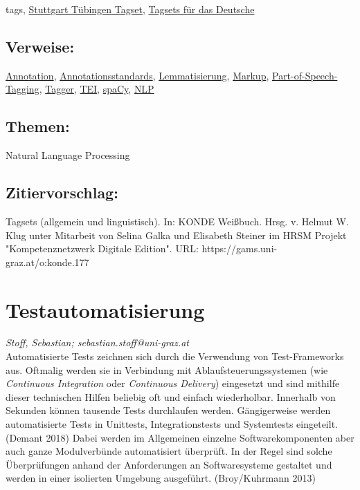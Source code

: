 \documentclass{article}
\begin{document}
{                           tags}, \href{https://homepage.ruhr-uni-bochum.de/Stephen.Berman/Korpuslinguistik/Tagsets-STTS.html}{Stuttgart Tübingen Tagset}, \href{https://www.ims.uni-stuttgart.de/forschung/ressourcen/lexika/germantagsets/}{Tagsets für das Deutsche}\subsection*{Verweise:}\href{https://gams.uni-graz.at/o:konde.17}{Annotation}, \href{https://gams.uni-graz.at/o:konde.29}{Annotationsstandards}, \href{https://gams.uni-graz.at/o:konde.115}{Lemmatisierung}, \href{https://gams.uni-graz.at/o:konde.126}{Markup}, \href{https://gams.uni-graz.at/o:konde.156}{Part-of-Speech-Tagging}, \href{https://gams.uni-graz.at/o:konde.176}{Tagger}, \href{https://gams.uni-graz.at/o:konde.178}{TEI}, \href{https://gams.uni-graz.at/o:konde.170}{spaCy}, \href{https://gams.uni-graz.at/o:konde.145}{NLP}\subsection*{Themen:}Natural Language Processing\subsection*{Zitiervorschlag:}Tagsets (allgemein und linguistisch). In: KONDE Weißbuch. Hrsg. v. Helmut W. Klug unter Mitarbeit von Selina Galka und Elisabeth Steiner im HRSM Projekt "Kompetenznetzwerk Digitale Edition". URL: https://gams.uni-graz.at/o:konde.177\newpage\section*{Testautomatisierung} \emph{Stoff, Sebastian; sebastian.stoff@uni-graz.at }\\
        
    Automatisierte Tests zeichnen sich durch die Verwendung von Test-Frameworks aus. Oftmalig werden sie in Verbindung mit Ablaufsteuerungssystemen (wie \emph{Continuous Integration} oder \emph{Continuous Delivery}) eingesetzt und sind mithilfe dieser technischen Hilfen beliebig oft und einfach wiederholbar. Innerhalb von Sekunden können tausende Tests durchlaufen werden. Gängigerweise werden automatisierte Tests in Unittests, Integrationstests und Systemtests eingeteilt. (Demant 2018) Dabei werden im Allgemeinen einzelne Softwarekomponenten aber auch ganze Modulverbünde automatisiert überprüft. In der Regel sind solche Überprüfungen anhand der Anforderungen an Softwaresysteme gestaltet und werden in einer isolierten Umgebung ausgeführt. (Broy/Kuhrmann 2013)\\
            
\end{document}
